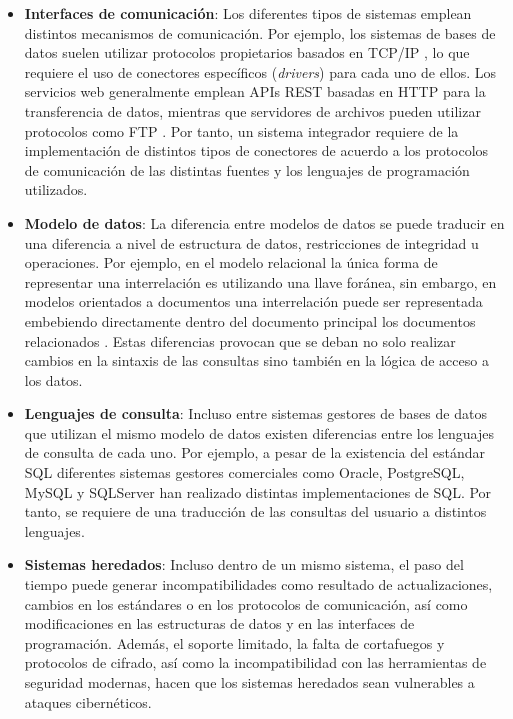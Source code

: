         \begin{itemize}
            \item \textbf{Interfaces de comunicación}: Los diferentes tipos de sistemas emplean distintos mecanismos de comunicación. 
            Por ejemplo, los sistemas de bases de datos suelen utilizar protocolos propietarios basados en TCP/IP \cite{eddy2022tcp}, lo que requiere el uso de conectores específicos (\textit{drivers}) \cite{bai2022jdbc} para cada uno de ellos.
            Los servicios web generalmente emplean APIs REST basadas en HTTP \cite{bishop2022http} para la transferencia de datos, mientras que servidores de archivos pueden utilizar protocolos como FTP \cite{rfc4217ftp}. Por tanto, un sistema
            integrador requiere de la implementación de distintos tipos de conectores de acuerdo a los protocolos de comunicación de las distintas fuentes y los lenguajes de programación utilizados.
            
            \item \textbf{Modelo de datos}: La diferencia entre modelos de datos se puede traducir en una diferencia a nivel
            de estructura de datos, restricciones de integridad u operaciones. Por ejemplo, en el modelo relacional la única forma
            de representar una interrelación es utilizando una llave foránea, sin embargo, en modelos orientados a documentos una
            interrelación puede ser representada embebiendo directamente dentro
            del documento principal los documentos relacionados \cite{mongodb2024embedding}. Estas diferencias provocan que se deban no solo realizar cambios en la
            sintaxis de las consultas sino también en la lógica de acceso a los datos.

            \item \textbf{Lenguajes de consulta}: Incluso entre sistemas gestores de bases de datos que utilizan el mismo modelo
            de datos existen diferencias entre los lenguajes de consulta de cada uno. Por ejemplo, a pesar de la existencia
            del estándar SQL diferentes sistemas gestores comerciales como Oracle, PostgreSQL, MySQL y SQLServer han realizado
            distintas implementaciones de SQL. Por tanto, se requiere de una traducción de las consultas del usuario a distintos lenguajes.

            \item \textbf{Sistemas heredados}: Incluso dentro de un mismo sistema, el paso del tiempo puede generar incompatibilidades 
            como resultado de actualizaciones, cambios en los estándares o en los protocolos de comunicación, 
            así como modificaciones en las estructuras de datos y en las interfaces de programación.
            Además, el soporte limitado, la falta de cortafuegos y protocolos de cifrado, así como la incompatibilidad con las 
            herramientas de seguridad modernas, hacen que los sistemas heredados sean vulnerables a ataques cibernéticos.
        \end{itemize}


